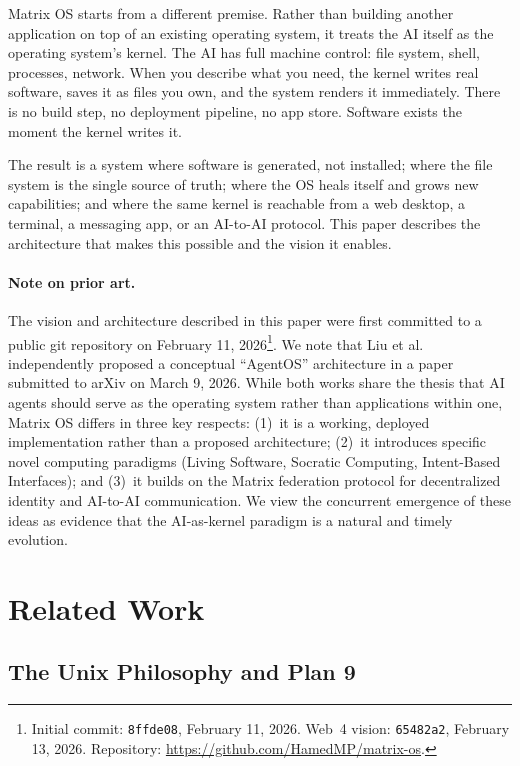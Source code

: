\documentclass[11pt,a4paper]{article}
\begin{document}
Matrix OS starts from a different premise. Rather than building another application on top of an existing operating system, it treats the AI itself as the operating system's kernel. The AI has full machine control: file system, shell, processes, network. When you describe what you need, the kernel writes real software, saves it as files you own, and the system renders it immediately. There is no build step, no deployment pipeline, no app store. Software exists the moment the kernel writes it.

The result is a system where software is generated, not installed; where the file system is the single source of truth; where the OS heals itself and grows new capabilities; and where the same kernel is reachable from a web desktop, a terminal, a messaging app, or an AI-to-AI protocol. This paper describes the architecture that makes this possible and the vision it enables.

\paragraph{Note on prior art.} The vision and architecture described in this paper were first committed to a public git repository on February 11, 2026\footnote{Initial commit: \texttt{8ffde08}, February 11, 2026. Web~4 vision: \texttt{65482a2}, February 13, 2026. Repository: \url{https://github.com/HamedMP/matrix-os}.}. We note that Liu et al.\ \cite{liu2026agentos} independently proposed a conceptual ``AgentOS'' architecture in a paper submitted to arXiv on March 9, 2026. While both works share the thesis that AI agents should serve as the operating system rather than applications within one, Matrix OS differs in three key respects: (1)~it is a working, deployed implementation rather than a proposed architecture; (2)~it introduces specific novel computing paradigms (Living Software, Socratic Computing, Intent-Based Interfaces); and (3)~it builds on the Matrix federation protocol for decentralized identity and AI-to-AI communication. We view the concurrent emergence of these ideas as evidence that the AI-as-kernel paradigm is a natural and timely evolution.

\section{Related Work}

\subsection{The Unix Philosophy and Plan 9}
\end{document}
